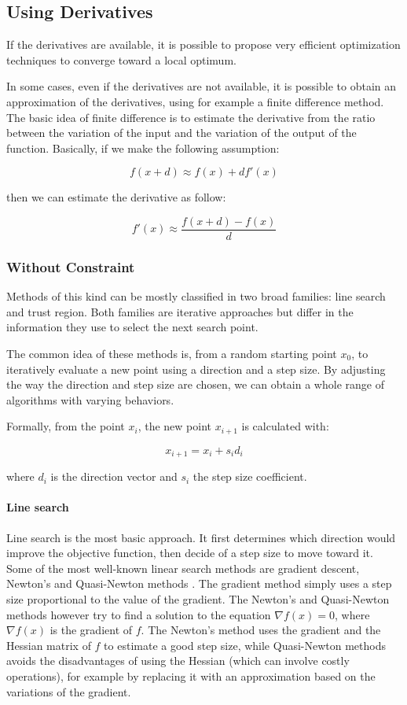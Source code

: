 \subsection{Using Derivatives}

If the derivatives are available, it is possible to propose very efficient optimization techniques to converge toward a local optimum.

In some cases, even if the derivatives are not available, it is possible to obtain an approximation of the derivatives, using for example a finite difference method. The basic idea of finite difference is to estimate the derivative from the ratio between the variation of the input and the variation of the output of the function.
Basically, if we make the following assumption:

$$f(x + d) \approx f(x) +df'(x)$$

then we can estimate the derivative as follow:

$$f'(x) \approx \frac{f(x + d) - f(x)}{d}$$

\subsubsection{Without Constraint}

Methods of this kind can be mostly classified in two broad families: line search and trust region.
Both families are iterative approaches but differ in the information they use to select the next search point.

The common idea of these methods is, from a random starting point $x_0$, to iteratively evaluate a new point using a direction and a step size.
By adjusting the way the direction and step size are chosen, we can obtain a whole range of algorithms with varying behaviors.

Formally, from the point $x_i$, the new point $x_{i+1}$ is calculated with:

$$x_{i+1} = x_i +s_i d_i$$

where $d_i$ is the direction vector and $s_i$ the step size coefficient.

\paragraph{Line search}

Line search is the most basic approach. It first determines which direction would improve the objective function, then decide of a step size to move toward it.
Some of the most well-known linear search methods are gradient descent, Newton's and Quasi-Newton methods \cite{dennis1983numerical}. The gradient method simply uses a step size proportional to the value of the gradient. The Newton's and Quasi-Newton methods however try to find a solution to the equation $\nabla f(x)=0$, where $\nabla f(x)$ is the gradient of $f$. The Newton's method uses the gradient and the Hessian matrix of $f$ to estimate a good step size, while Quasi-Newton methods avoids the disadvantages of using the Hessian (which can involve costly operations), for example by replacing it with an approximation based on the variations of the gradient.

